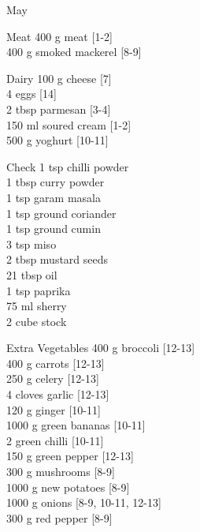 \begin{menu}{May}
\begin{shoppinglist}{Meat}
      400 g meat {\scriptsize[1-2]}\\
      400 g smoked mackerel {\scriptsize[8-9]}\\
      \end{shoppinglist}%
      \begin{shoppinglist}{Dairy}
      100 g cheese {\scriptsize[7]}\\
      4  eggs {\scriptsize[14]}\\
      2 tbsp parmesan {\scriptsize[3-4]}\\
      150 ml soured cream {\scriptsize[1-2]}\\
      500 g yoghurt {\scriptsize[10-11]}\\
      \end{shoppinglist}%
      \par\vfil %
      \vfil\clearpage %
      \begin{shoppinglist}{Check}
      1 tsp chilli powder \\
      1 tbsp curry powder \\
      1 tsp garam masala \\
      1 tsp ground coriander \\
      1 tsp ground cumin \\
      3 tsp miso \\
      2 tbsp mustard seeds \\
      21 tbsp oil \\
      1 tsp paprika \\
      75 ml sherry \\
      2 cube stock \\
      \end{shoppinglist}%
      \begin{shoppinglist}{Extra Vegetables}
      400 g broccoli {\scriptsize[12-13]}\\
      400 g carrots {\scriptsize[12-13]}\\
      250 g celery {\scriptsize[12-13]}\\
      4 cloves garlic {\scriptsize[12-13]}\\
      120 g ginger {\scriptsize[10-11]}\\
      1000 g green bananas {\scriptsize[10-11]}\\
      2  green chilli {\scriptsize[10-11]}\\
      150 g green pepper {\scriptsize[12-13]}\\
      300 g mushrooms {\scriptsize[8-9]}\\
      1000 g new potatoes {\scriptsize[8-9]}\\
      1000 g onions {\scriptsize[8-9, 10-11, 12-13]}\\
      300 g red pepper {\scriptsize[8-9]}\\
      \end{shoppinglist}%
      \par\vfil %
    \vfil\clearpage
  

\end{menu}
